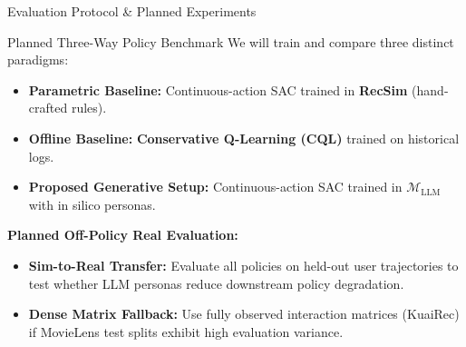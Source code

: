 \documentclass[handout]{beamer}
\begin{document}
\begin{frame}{Evaluation Protocol \& Planned Experiments}
  \begin{block}{Planned Three-Way Policy Benchmark}
    \small
    We will train and compare three distinct paradigms:
    \begin{itemize}
      \item \textbf{Parametric Baseline:} Continuous-action SAC trained in \textbf{RecSim} (hand-crafted rules).
      \item \textbf{Offline Baseline:} \textbf{Conservative Q-Learning (CQL)} trained on historical logs.
      \item \textbf{Proposed Generative Setup:} Continuous-action SAC trained in \textbf{$\mathcal{M}_{\text{LLM}}$} with in silico personas.
    \end{itemize}
  \end{block}

  \pause
  \vspace{0.1cm}

  {\textbf{\textcolor{PomonaNavy}{Planned Off-Policy Real Evaluation:}}}
  \small
  \begin{itemize}
    \item \textbf{Sim-to-Real Transfer:} Evaluate all policies on held-out user trajectories to test whether LLM personas reduce downstream policy degradation.
    \item \textbf{Dense Matrix Fallback:} Use fully observed interaction matrices (KuaiRec) if MovieLens test splits exhibit high evaluation variance.
  \end{itemize}
\end{frame}
\end{document}

